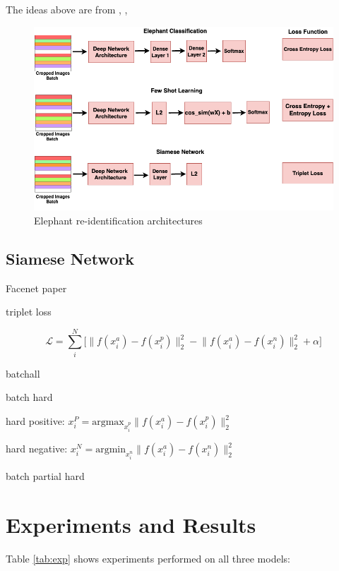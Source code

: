\documentclass[10pt,twocolumn,letterpaper]{article}
\begin{document}
The ideas above are from \cite{fewshotlectures}, \cite{fewshotbaseline}, \cite{fewshotmetabaseline}


\begin{figure}[t]
  \centering
  \includegraphics[scale=0.275]{reidentification_network}
   \caption{Elephant re-identification architectures}
   \label{fig:reidentification_network}
\end{figure}

\subsection{Siamese Network}

Facenet paper

triplet loss

$$
\mathcal{L} = \sum_{i}^N \Big[ \lVert f(x_i^a) - f(x_i^p)\rVert_2^2 - \lVert f(x_i^a) - f(x_i^n)\rVert_2^2  + \alpha \Big]
$$

batchall

batch hard

hard positive: $x_i^P = \text{argmax}_{x_i^p}  \lVert f(x_i^a) - f(x_i^p)\rVert_2^2$

hard negative: $x_i^N = \text{argmin}_{x_i^n}  \lVert f(x_i^a) - f(x_i^n)\rVert_2^2$

batch partial hard



\section{Experiments and Results}
\label{sec:expresults}

Table \ref{tab:exp} shows experiments performed on all three models:
\end{document}
